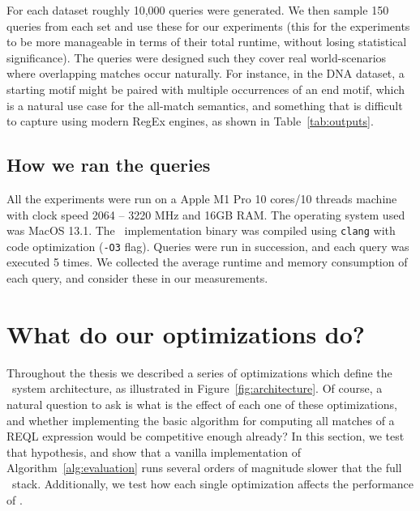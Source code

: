 For each dataset roughly 10,000 queries were generated. We then sample 150
queries from each set and use these for our experiments (this for the
experiments to be more manageable in terms of their total runtime, without
losing statistical significance). The queries were designed such they cover real
world-scenarios where overlapping matches occur naturally. For instance, in the
\textsf{DNA} dataset, a starting motif might be paired with multiple occurrences
of an end motif, which is a natural use case for the all-match semantics, and
something that is difficult to capture using modern RegEx engines, as shown in
Table~\ref{tab:outputs}. 


\subsection{How we ran the queries}
All the experiments were run on a Apple M1 Pro 10 cores/10 threads machine with
clock speed 2064 -- 3220 MHz and 16GB RAM. The operating system used was MacOS
13.1.   The \rematch\ implementation binary was compiled using \texttt{clang}
with code optimization (\texttt{-O3} flag). Queries were run in succession, and
each query was executed 5 times. We collected the average runtime and memory
consumption of each query, and consider these in our measurements.

\section{What do our optimizations do?}\label{ss:internal} Throughout the thesis
we described a series of optimizations which define the \rematch\ system
architecture, as illustrated in Figure~\ref{fig:architecture}. Of course, a
natural question to ask is what is the effect of each one of these
optimizations, and whether implementing the basic algorithm for computing all
matches of a REQL expression  would be competitive enough already? In this
section, we test that hypothesis, and show that a vanilla implementation of
Algorithm~\ref{alg:evaluation} runs several orders of magnitude slower that the
full \rematch\ stack. Additionally, we test how each single optimization affects
the performance of \rematch.





